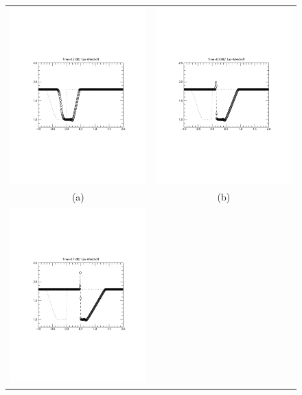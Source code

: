 \documentclass[10.5pt
]{article}
\begin{document}
\begin{figure}[htb]
	\begin{center}
		\begin{tabular}{cc}
			\includegraphics[width=.45\textwidth]{fig2_2_1}
			&
			\includegraphics[width=.45\textwidth]{fig2_2_2}
			\\[-10pt]
			(a) & (b)
			\\
			\includegraphics[width=.45\textwidth]{fig2_2_3}

\end{tabular}
\end{center}
\end{figure}
\end{document}
